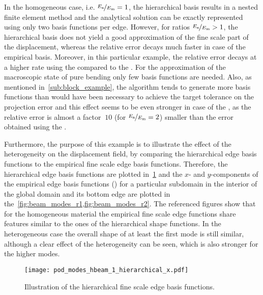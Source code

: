 \documentclass[AMA,STIX1COL,doublespace]{WileyNJD-v2}
\begin{document}
In the homogeneous case, i.e. $\nicefrac{E_{\mathrm{a}}}{E_{\mathrm{m}}}=1$, the 
hierarchical basis results in a nested
finite element method and the analytical solution can be exactly represented
using only two basis functions per edge.
However, for ratios $\nicefrac{E_{\mathrm{a}}}{E_{\mathrm{m}}}>1$, the hierarchical
basis does not yield a good approximation of the fine scale part of the displacement,
whereas the relative error decays much faster in case of the empirical basis.
Moreover, in this particular example, the relative error decays at a higher
rate using the  compared
to the .
For the approximation of the macroscopic state of pure bending only few basis
functions are needed.
Also, as mentioned in~\cref{sub:block_example}, the algorithm tends to
generate more basis functions than would have been necessary to
achieve the target tolerance on the projection error and this
effect seems to be even stronger in case of the , as the relative error is almost a factor $~10$
(for $\nicefrac{E_{\mathrm{a}}}{E_{\mathrm{m}}}=2$) smaller
than the error obtained using the .

Furthermore, the purpose of this example is to illustrate the effect
of the heterogeneity on the displacement field, by comparing
the hierarchical edge basis
functions to the empirical fine scale edge basis functions.
Therefore, the hierarchical edge basis functions are plotted 
in~\cref{fig:beam_modes_hier} and the $x$- and $y$-components 
of the empirical edge basis functions
()
for a particular subdomain in the interior of the global domain
and its bottom edge
are plotted in the~\cref{fig:beam_modes_r1,fig:beam_modes_r2}.
The referenced figures show that for the homogeneous material the empirical 
fine scale edge functions share features similar to the ones of the
hierarchical shape functions.
In the heterogeneous case the overall shape of at least the first mode
is still similar, although a clear effect of the heterogeneity can be
seen, which is also stronger for the higher modes.

\begin{figure}[htb]
	\centering
	\texttt{[image: pod\_modes\_hbeam\_1\_hierarchical\_x.pdf]}
	\caption{Illustration of the hierarchical fine scale edge basis functions.}%
	\label{fig:beam_modes_hier}
\end{figure}
\end{document}

